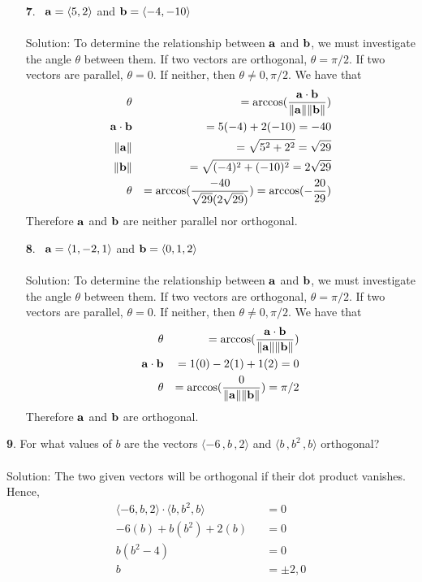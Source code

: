 \documentclass[12pt]{amsbook}
\newcommand{\la}{\langle}
\newcommand{\ra}{\rangle}
\begin{document}
\begin{enumerate}
  \item [{\small\bf 7}.]\ ${\bf a}=\la 5,2\ra$ and ${\bf b}=\la -4,-10\ra$
\\
\\
{\sc Solution}:
To determine the relationship between ${\bf a}$ and ${\bf b}$, we must investigate the angle $\theta$ between them. If two vectors are orthogonal, $\theta=\pi/2$. If two vectors are parallel, $\theta=0$. If neither, then $\theta \neq 0,\pi/2$. We have that 
\begin{eqnarray*}
\theta &&=\arccos(\frac{{\bf a}\cdot{\bf b}}{\|{\bf a}\|\|{\bf b}\|})\\
{\bf a}\cdot{\bf b}&&=5(-4)+2(-10)=-40 \\
\|{\bf a}\| &&=\sqrt{5^2+2^2}=\sqrt{29} \\
\|{\bf b}\| &&=\sqrt{(-4)^2+(-10)^2}=2\sqrt{29}\\ 
\theta &&=\arccos(\frac{-40}{\sqrt{29}(2\sqrt{29})})=\arccos(-\frac{20}{29})
\end{eqnarray*} 
Therefore $\bf a$ and $\bf b$ are neither parallel nor orthogonal.
\\
  \item [{\small\bf 8}.]\ ${\bf a}=\la 1,-2,1\ra$ and ${\bf b}=\la 0,1,2\ra$
\\
\\
{\sc Solution}:
To determine the relationship between ${\bf a}$ and ${\bf b}$, we must investigate the angle $\theta$ between them. If two vectors are orthogonal, $\theta=\pi/2$. If two vectors are parallel, $\theta=0$. If neither, then $\theta \neq 0,\pi/2$. We have that 
\begin{eqnarray*}
\theta &&=\arccos(\frac{{\bf a}\cdot{\bf b}}{\|{\bf a}\|\|{\bf b}\|})\\
{\bf a}\cdot{\bf b}&&=1(0)-2(1)+1(2)=0 \\
\theta &&=\arccos(\frac{0}{\|{\bf a}\|\|{\bf b}\|})=\pi /2
\end{eqnarray*} 
Therefore $\bf a$ and $\bf b$ are orthogonal.
\\
\end{enumerate}  
{\small\bf 9}. For what values of $b$ are the vectors $\langle -6\,
,b\, ,2\rangle$ and $\langle b\, ,b^2\, ,b\rangle$ orthogonal?\\
\\
{\sc Solution}:
The two given vectors will be orthogonal if their dot product vanishes. Hence,
\begin{eqnarray*}
\la -6,b,2 \ra \cdot \la b, b^2, b\ra &&=0\\
-6(b)+b(b^2)+2(b)&&=0\\
b(b^2-4) &&=0 \\
b&&=\pm 2,0
\end{eqnarray*}
\end{document}
